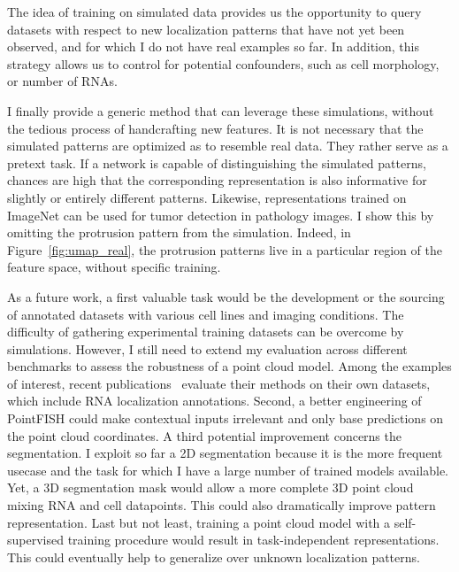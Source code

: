 The idea of training on simulated data provides us the opportunity to query datasets with respect to new localization patterns that have not yet been observed, and for which I do not have real examples so far.
In addition, this strategy allows us to control for potential confounders, such as cell morphology, or number of \ac{RNA}s.

I finally provide a generic method that can leverage these simulations, without the tedious process of handcrafting new features.
It is not necessary that the simulated patterns are optimized as to resemble real data.
They rather serve as a pretext task.
If a network is capable of distinguishing the simulated patterns, chances are high that the corresponding representation is also informative for slightly or entirely different patterns.
Likewise, representations trained on ImageNet can be used for tumor detection in pathology images.
I show this by omitting the protrusion pattern from the simulation.
Indeed, in Figure~\ref{fig:umap_real}, the protrusion patterns live in a particular region of the feature space, without specific training.


As a future work, a first valuable task would be the development or the sourcing of annotated datasets with various cell lines and imaging conditions.
The difficulty of gathering experimental training datasets can be overcome by simulations.
However, I still need to extend my evaluation across different benchmarks to assess the robustness of a point cloud model.
Among the examples of interest, recent publications~\cite{savulescu_interrogating_2021,mah_bento_2022} evaluate their methods on their own datasets, which include \ac{RNA} localization annotations.
Second, a better engineering of PointFISH could make contextual inputs irrelevant and only base predictions on the point cloud coordinates.
A third potential improvement concerns the segmentation.
I exploit so far a 2D segmentation because it is the more frequent usecase and the task for which I have a large number of trained models available.
Yet, a 3D segmentation mask would allow a more complete 3D point cloud mixing \ac{RNA} and cell datapoints.
This could also dramatically improve pattern representation.
Last but not least, training a point cloud model with a self-supervised training procedure would result in task-independent representations.
This could eventually help to generalize over unknown localization patterns.

